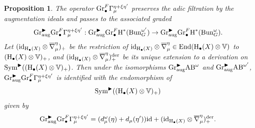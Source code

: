 \documentclass[reqno]{amsart}
\numberwithin{equation}{subsection}
\newtheorem{prop}[subsubsection]{Proposition}
\newtheorem{cor}[subsubsection]{Corollary}
\theoremstyle{definition}
\def\VV{\mathbb{V}}
\newcommand{\Bun}{\textup{Bun}}
\newcommand{\Gr}{\textup{Gr}}
\newcommand\id{\textup{id}}
\newcommand\Sym{\textup{Sym}}
\newcommand\End{\textup{End}}
\newcommand{\der}{\textup{der}}
\newcommand{\Qlbar}{\overline{\Q}_\ell}
\newcommand\un{\underline}
\newcommand{\bu}{\bullet}
\newcommand{\ov}{\overline}
\newcommand\ot{\otimes}
\newcommand{\homog}[2]{\textup{H}_{#1}({#2})}  %
\newcommand{\cohog}[2]{\textup{H}^{#1}({#2})}     %
\newcommand\G\Gamma
\newcommand{\e}{\epsilon}
\newcommand{\y}{\eta}
\newcommand{\om}{\omega}
\newcommand\aug{\textup{aug}}
\newcommand\AB{\textup{AB}}
\newcommand\bl{\blacktriangleright}
\newcommand\nb{\nabla}
\newcommand{\Q}{\mathbf{Q}}
\begin{document}
\begin{prop}\label{prop: split action on graded} The operator $\Gr^F_{\bu}\G_{\mu}^{\y + \xi \y'}$ preserves the adic filtration by the augmentation ideals and passes to the associated graded
\begin{equation*}
\Gr^{\bl}_{\aug}\Gr^{F}_{\bu}\G_{\mu}^{\y + \xi \y'}: \Gr^{\bl}_{\aug}\Gr^{F}_{\bu}\cohog{*}{\Bun^{\om'}_{G}}\to \Gr^{\bl}_{\aug}\Gr^{F}_{\bu}\cohog{*}{\Bun^{\om}_{G}}.
\end{equation*}
Let $(\id_{\homog{\bu}{X}}\ot\ov\nb^{\y}_{\mu})_{+}$ be the restriction of $\id_{\homog{\bu}{X}}\ot\ov\nb^{\y}_{\mu}\in \End(\homog{\bu}{X}\ot \VV)$ to $(\homog{\bu}{X}\ot \VV)_{+}$, and $(\id_{\homog{\bu}{X}}\ot\ov\nb^{\y}_{\mu})_{+}^{\der}$ be its unique extension to a derivation on $\Sym^{\bl}((\homog{\bu}{X}\ot \VV)_{+})$. Then under the isomorphisms $\Gr^{\bl}_{\aug}\AB^{\om}$ and $\Gr^{\bl}_{\aug}\AB^{\om'}$, $\Gr^{\bl}_{\aug}\Gr^{F}_{\bu}\G_{\mu}^{\y + \xi \y'}$ is identified with the endomorphism of
\begin{equation*}
\Sym^{\bl}((\homog{\bu}{X}\ot \VV)_{+})
\end{equation*}
given by
\begin{equation*}
\Gr^{\bl}_{\aug}\Gr^{F}_{\bu}\G_{\mu}^{\y + \xi \y'}=(d^{\om}_{\mu}(\y)+d_{\mu}(\y'))\id+(\id_{\homog{\bu}{X}}\ot\ov\nb^{\y}_{\mu})_{+}^{\der}.
\end{equation*}
\end{prop}

\end{document}
